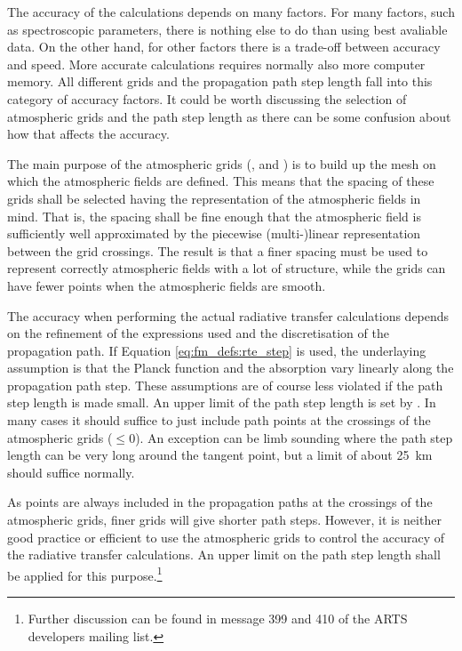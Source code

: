 The accuracy of the calculations depends on many factors. For many
factors, such as spectroscopic parameters, there is nothing else to do
than using best avaliable data. On the other hand, for other factors
there is a trade-off between accuracy and speed. More accurate
calculations requires normally also more computer memory. All
different grids and the propagation path step length fall into this
category of accuracy factors. It could be worth discussing the
selection of atmospheric grids and the path step length as there can
be some confusion about how that affects the accuracy.

The main purpose of the atmospheric grids (,
 and ) is to build up the
mesh on which the atmospheric fields are defined. This means that the
spacing of these grids shall be selected having the representation of
the atmospheric fields in mind. That is, the spacing shall be fine
enough that the atmospheric field is sufficiently well approximated by
the piecewise (multi-)linear representation between the grid
crossings. The result is that a finer spacing must be used to
represent correctly atmospheric fields with a lot of structure, while
the grids can have fewer points when the atmospheric fields are
smooth. 

The accuracy when performing the actual radiative transfer calculations depends
on the refinement of the expressions used and the discretisation of the
propagation path. If Equation \ref{eq:fm_defs:rte_step} is used, the
underlaying assumption is that the Planck function and the absorption vary
linearly along the propagation path step. These assumptions are of course less
violated if the path step length is made small. An upper limit of the path step
length is set by . In many cases it should suffice to
just include path points at the crossings of the atmospheric grids
($\leq0$). An exception can be limb sounding where the
path step length can be very long around the tangent point, but a limit of
about 25~km should suffice normally.

As points are always included in the propagation paths at the
crossings of the atmospheric grids, finer grids will give shorter path
steps. However, it is neither good practice or efficient to use the
atmospheric grids to control the accuracy of the radiative transfer
calculations. An upper limit on the path step length shall be applied
for this purpose.\footnote{Further discussion can be found in message
  399 and 410 of the ARTS developers mailing list.}


